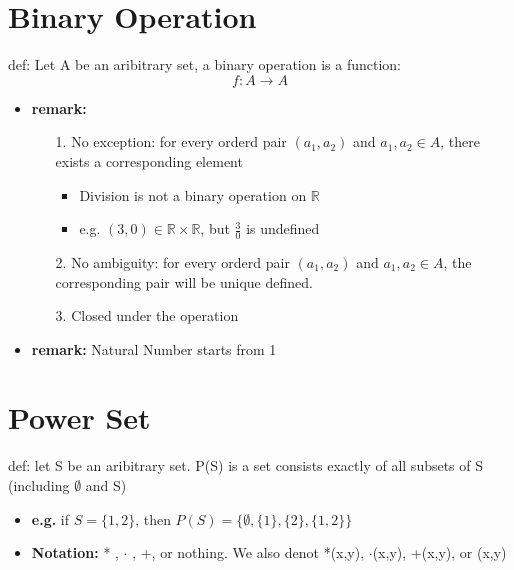 \documentclass{article}
\begin{document}
    \section{Binary Operation}
        def: Let A be an aribitrary set, a binary operation is a function: \[f: A \rightarrow A\]
        \begin{itemize}
            \item \textbf{remark:}
            \begin{enumerate}[align=left,leftmargin=15mm]
                \item[1. No exception:] for every orderd pair \((a_1,a_2)\) and \(a_1,a_2 \in A\), there exists a corresponding element
                \begin{itemize}
                    \item Division is not a binary operation on \(\mathbb R\)
                    \item e.g. \((3,0) \in \mathbb R \times \mathbb R\), but \(\frac{3}{0}\) is undefined
                \end{itemize} 
                \item[2. No ambiguity:] for every orderd pair \((a_1,a_2)\) and \(a_1,a_2 \in A\), the corresponding pair will be unique defined.
                \item[3.] Closed under the operation
            \end{enumerate}
            
            \item \textbf{remark:}
                \indent Natural Number starts from 1
        \end{itemize}
    
    \section{Power Set}
        def: let S be an aribitrary set. P(S) is a set consists exactly of all subsets of S (including \(\emptyset\) and S)
        \begin{itemize}
            \item  \textbf{e.g.} if \(S=\{1,2\}\), then \(P(S) = \{\emptyset,\{1\},\{2\},\{1,2\}\}\)\\
            \item  \textbf{Notation:} * , \(\cdot\) , +, or nothing. We also denot *(x,y), \(\cdot\)(x,y), +(x,y), or (x,y)
        \end{itemize}
        
\end{document}

